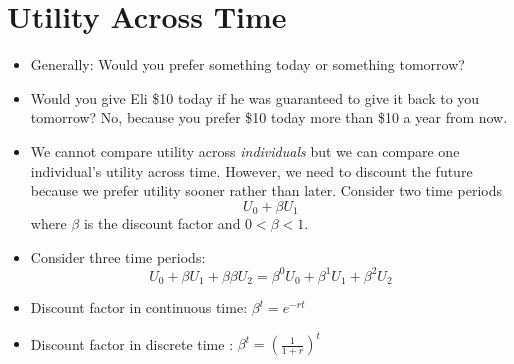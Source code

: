 \documentclass{article}
\begin{document}
\section{Utility Across Time}
\begin{itemize}
    \item Generally: Would you prefer something today or something tomorrow?
    \item Would you give Eli \$10 today if he was guaranteed to give it back to you tomorrow? No, because you prefer \$10 today more than \$10 a year from now. 
    \item We cannot compare utility across \textit{individuals} but we can compare one individual's utility across time. However, we need to discount the future because we prefer utility sooner rather than later. 
    Consider two time periods
    $$U_0 + \beta U_1$$
    where $\beta$ is the discount factor and $0<\beta<1$.
    \item Consider three time periods:
     $$U_0 + \beta U_1 + \beta \beta U_2 =  \beta ^ 0U_0 + \beta^1 U_1 + \beta^2 U_2 $$
     \item Discount factor in continuous time: $\beta^t = e^{-rt}$
     \item Discount factor in discrete time : $\beta^t = (\frac{1}{1+r})^t$
     
\end{itemize}
\end{document}
